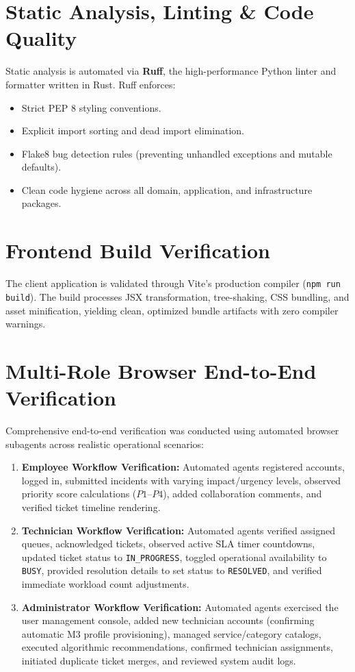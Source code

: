 \documentclass[11pt,a4paper,oneside]{report}
\begin{document}
\section{Static Analysis, Linting \& Code Quality}
\label{sec:test_linting}
Static analysis is automated via \textbf{Ruff}, the high-performance Python linter and formatter written in Rust. Ruff enforces:
\begin{itemize}
    \item Strict PEP 8 styling conventions.
    \item Explicit import sorting and dead import elimination.
    \item Flake8 bug detection rules (preventing unhandled exceptions and mutable defaults).
    \item Clean code hygiene across all domain, application, and infrastructure packages.
\end{itemize}

\section{Frontend Build Verification}
\label{sec:test_frontend_build}
The client application is validated through Vite's production compiler (\texttt{npm run build}). The build processes JSX transformation, tree-shaking, CSS bundling, and asset minification, yielding clean, optimized bundle artifacts with zero compiler warnings.

\section{Multi-Role Browser End-to-End Verification}
\label{sec:test_browser_e2e}
Comprehensive end-to-end verification was conducted using automated browser subagents across realistic operational scenarios:
\begin{enumerate}
    \item \textbf{Employee Workflow Verification:} Automated agents registered accounts, logged in, submitted incidents with varying impact/urgency levels, observed priority score calculations ($P1$--$P4$), added collaboration comments, and verified ticket timeline rendering.
    \item \textbf{Technician Workflow Verification:} Automated agents verified assigned queues, acknowledged tickets, observed active SLA timer countdowns, updated ticket status to \texttt{IN\_PROGRESS}, toggled operational availability to \texttt{BUSY}, provided resolution details to set status to \texttt{RESOLVED}, and verified immediate workload count adjustments.
    \item \textbf{Administrator Workflow Verification:} Automated agents exercised the user management console, added new technician accounts (confirming automatic M3 profile provisioning), managed service/category catalogs, executed algorithmic recommendations, confirmed technician assignments, initiated duplicate ticket merges, and reviewed system audit logs.
\end{enumerate}
\end{document}
